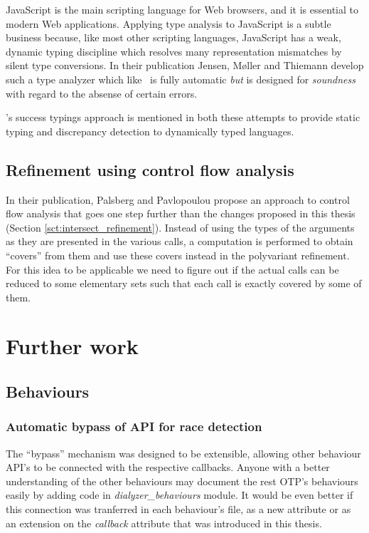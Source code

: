 JavaScript is the main scripting language for Web browsers, and it is
essential to modern Web applications. Applying type analysis to
JavaScript is a subtle business because, like most other scripting
languages, JavaScript has a weak, dynamic typing discipline which
resolves many representation mismatches by silent type conversions. In
their publication\cite{javascript} Jensen, M\o ller and Thiemann
develop such a type analyzer which like \dr\ is fully automatic
\emph{but} is designed for \emph{soundness} with regard to the absense
of certain errors.

\dr's success typings approach is mentioned in both these attempts to
provide static typing and discrepancy detection to dynamically typed
languages.

\subsection{Refinement using control flow analysis}

In their publication, Palsberg and Pavlopoulou \cite{polyvariant}
propose an approach to control flow analysis that goes one step
further than the changes proposed in this thesis (Section
\ref{sct:intersect_refinement}). Instead of using the types of the
arguments as they are presented in the various calls, a computation is
performed to obtain ``covers'' from them and use these covers instead
in the polyvariant refinement. For this idea to be applicable we need
to figure out if the actual calls can be reduced to some elementary
sets such that each call is exactly covered by some of them.

\section{Further work}
\label{sct:further_work}

\subsection{Behaviours}
\subsubsection{Automatic bypass of API for race detection}

The ``bypass'' mechanism was designed to be extensible, allowing other
behaviour API's to be connected with the respective callbacks. Anyone
with a better understanding of the other behaviours may document the
rest OTP's behaviours easily by adding code in
\emph{dialyzer\_behaviours} module. It would be even better if this
connection was tranferred in each behaviour's file, as a new attribute
or as an extension on the \emph{callback} attribute that was
introduced in this thesis.

